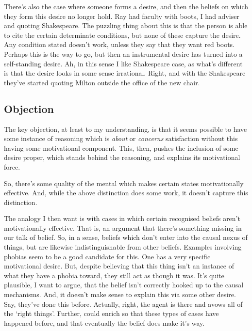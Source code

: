 \documentclass[10pt]{article}
\begin{document}
There's also the case where someone forms a desire, and then the beliefs on which they form this desire no longer hold.
Ray had faculty with boots, I had adviser and quoting Shakespeare.
The puzzling thing about this is that the person is able to cite the certain determinate conditions, but none of these capture the desire.
Any condition stated doesn't work, unless they say that they want red boots.
Perhaps this is the way to go, but then an instrumental desire has turned into a self-standing desire.
Ah, in this sense I like Shakespeare case, as what's different is that the desire looks in some sense irrational.
Right, and with the Shakespeare they've started quoting Milton outside the office of the new chair.


\subsection{Objection}
\label{sec:objection}

The key objection, at least to my understanding, is that it seems possible to have some instance of reasoning which is \emph{about} or \emph{concerns} satisfaction without this having some motivational component.
This, then, pushes the inclusion of some desire proper, which stands behind the reasoning, and explains its motivational force.

So, there's some quality of the mental which makes certain states motivationally effective.
And, while the above distinction does some work, it doesn't capture this distinction.

The analogy I then want is with cases in which certain recognised beliefs aren't motivationally effective.
That is, an argument that there's something missing in our talk of belief.
So, in a sense, beliefs which don't enter into the causal nexus of things, but are likewise indistinguishable from other beliefs.
Examples involving phobias seem to be a good candidate for this.
One has a very specific motivational desire.
But, despite believing that this thing isn't an instance of what they have a phobia toward, they still act as though it was.
It's quite plausible, I want to argue, that the belief isn't correctly hooked up to the causal mechanisms.
And, it doesn't make sense to explain this via some other desire.
Say, they've done this before.
Actually, right, the agent is there and avows all of the `right things'.
Further, could enrich so that these types of cases have happened before, and that eventually the belief does make it's way.
\end{document}
